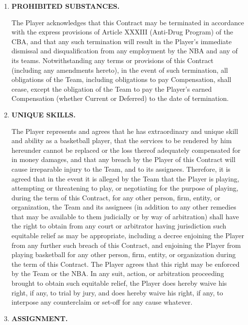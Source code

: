 \documentclass[
]{book}
\begin{document}
\begin{enumerate}
\def\labelenumi{\arabic{enumi}.}
\setcounter{enumi}{7}
\item
  \textbf{PROHIBITED SUBSTANCES.}

  The Player acknowledges that this Contract may be terminated in accordance with the express provisions of Article XXXIII (Anti-Drug Program) of the CBA, and that any such termination will result in the Player's immediate dismissal and disqualification from any employment by the NBA and any of its teams. Notwithstanding any terms or provisions of this Contract (including any amendments hereto), in the event of such termination, all obligations of the Team, including obligations to pay Compensation, shall cease, except the obligation of the Team to pay the Player's earned Compensation (whether Current or Deferred) to the date of termination.
\item
  \textbf{UNIQUE SKILLS.}

  The Player represents and agrees that he has extraordinary and unique skill and ability as a basketball player, that the services to be rendered by him hereunder cannot be replaced or the loss thereof adequately compensated for in money damages, and that any breach by the Player of this Contract will cause irreparable injury to the Team, and to its assignees. Therefore, it is agreed that in the event it is alleged by the Team that the Player is playing, attempting or threatening to play, or negotiating for the purpose of playing, during the term of this Contract, for any other person, firm, entity, or organization, the Team and its assignees (in addition to any other remedies that may be available to them judicially or by way of arbitration) shall have the right to obtain from any court or arbitrator having jurisdiction such equitable relief as may be appropriate, including a decree enjoining the Player from any further such breach of this Contract, and enjoining the Player from playing basketball for any other person, firm, entity, or organization during the term of this Contract. The Player agrees that this right may be enforced by the Team or the NBA. In any suit, action, or arbitration proceeding brought to obtain such equitable relief, the Player does hereby waive his right, if any, to trial by jury, and does hereby waive his right, if any, to interpose any counterclaim or set-off for any cause whatever.
\item
  \textbf{ASSIGNMENT.}
\end{enumerate}
\end{document}

